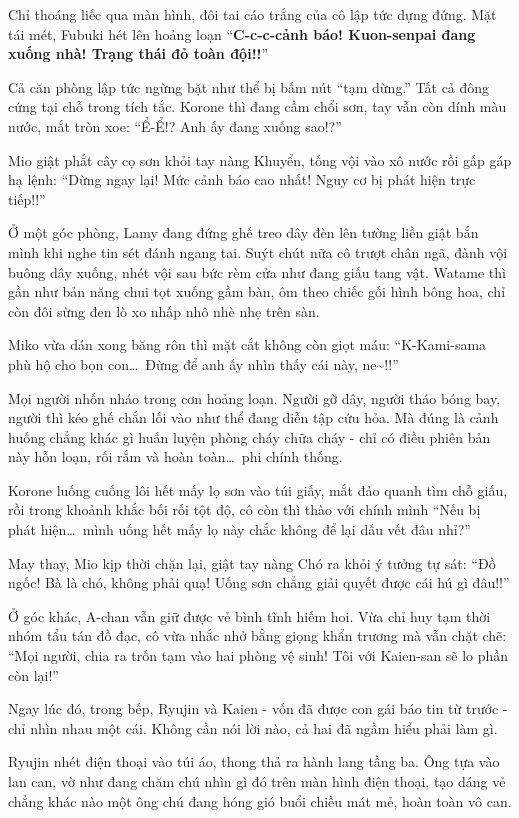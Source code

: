 \documentclass[../main.tex]{subfiles}
\begin{document}
Chỉ thoáng liếc qua màn hình, đôi tai cáo trắng của cô lập tức dựng đứng. Mặt tái mét, Fubuki hét lên hoảng loạn ``\textbf{C-c-c-cảnh báo! Kuon-senpai đang xuống nhà! Trạng thái đỏ toàn đội!!}''

Cả căn phòng lập tức ngừng bặt như thể bị bấm nút ``tạm dừng.''  Tất cả đông cứng tại chỗ trong tích tắc. Korone thì đang cầm chổi sơn, tay vẫn còn dính màu nước, mắt tròn xoe: ``Ể-Ể!? Anh ấy đang xuống sao!?''

Mio giật phắt cây cọ sơn khỏi tay nàng Khuyển, tống vội vào xô nước rồi gấp gáp hạ lệnh: ``Dừng ngay lại! Mức cảnh báo cao nhất! Nguy cơ bị phát hiện trực tiếp!!''

Ở một góc phòng, Lamy đang đứng ghế treo dây đèn lên tường liền giật bắn mình khi nghe tin sét đánh ngang tai. Suýt chút nữa cô trượt chân ngã, đành vội buông dây xuống, nhét vội sau bức rèm cửa như đang giấu tang vật. Watame thì gần như bản năng chui tọt xuống gầm bàn, ôm theo chiếc gối hình bông hoa, chỉ còn đôi sừng đen lò xo nhấp nhô nhè nhẹ trên sàn.

Miko vừa dán xong băng rôn thì mặt cắt không còn giọt máu: ``K-Kami-sama phù hộ cho bọn con\dots\ Đừng để anh ấy nhìn thấy cái này, ne\~{}!!''

Mọi người nhốn nháo trong cơn hoảng loạn. Người gỡ dây, người tháo bóng bay, người thì kéo ghế chắn lối vào như thể đang diễn tập cứu hỏa. Mà đúng là cảnh huống chẳng khác gì huấn luyện phòng cháy chữa cháy - chỉ có điều phiên bản này hỗn loạn, rối rắm và hoàn toàn\dots\ phi chính thống.

Korone luống cuống lôi hết mấy lọ sơn vào túi giấy, mắt đảo quanh tìm chỗ giấu, rồi trong khoảnh khắc bối rối tột độ, cô còn thì thào với chính mình ``Nếu bị phát hiện\dots\ mình uống hết mấy lọ này chắc không để lại dấu vết đâu nhỉ?''

May thay, Mio kịp thời chặn lại, giật tay nàng Chó ra khỏi ý tưởng tự sát: ``Đồ ngốc! Bà là chó, không phải quạ! Uống sơn chẳng giải quyết được cái hú gì đâu!!''

Ở góc khác, A-chan vẫn giữ được vẻ bình tĩnh hiếm hoi. Vừa chỉ huy tạm thời nhóm tẩu tán đồ đạc, cô vừa nhắc nhở bằng giọng khẩn trương mà vẫn chặt chẽ: ``Mọi người, chia ra trốn tạm vào hai phòng vệ sinh! Tôi với Kaien-san sẽ lo phần còn lại!''

Ngay lúc đó, trong bếp, Ryujin và Kaien - vốn đã được con gái báo tin từ trước - chỉ nhìn nhau một cái. Không cần nói lời nào, cả hai đã ngầm hiểu phải làm gì.

Ryujin nhét điện thoại vào túi áo, thong thả ra hành lang tầng ba. Ông tựa vào lan can, vờ như đang chăm chú nhìn gì đó trên màn hình điện thoại, tạo dáng vẻ chẳng khác nào một ông chú đang hóng gió buổi chiều mát mẻ, hoàn toàn vô can.
\end{document}
